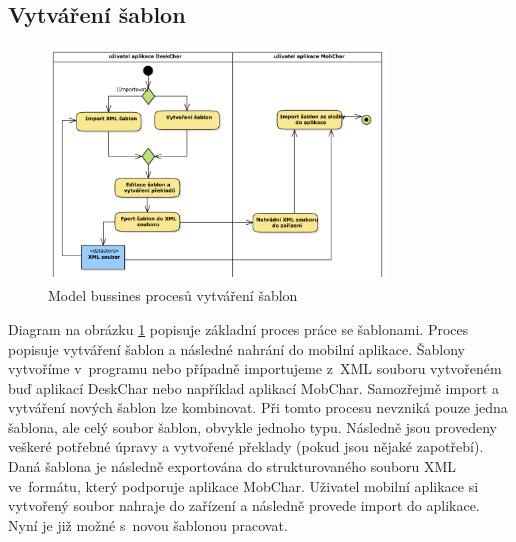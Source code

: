 \documentclass[thesis=B,czech]{resources/FITthesis}[2012/06/26]
\begin{document}
\subsection{Vytváření šablon} \label{sec:vytvareni_sablon}
\begin{figure}\centering
	\includegraphics[width=0.8\textwidth]{images/bussiness_sablony}
	\caption[Business proces vytváření šablon]{Model bussines procesů vytváření šablon}\label{fig:bp_sablony}
\end{figure}
Diagram na obrázku \ref{fig:bp_sablony} popisuje základní proces práce se šablonami. Proces popisuje vytváření šablon a následné nahrání do mobilní aplikace. Šablony vytvoříme v~programu nebo případně importujeme z~XML souboru vytvořeném buď aplikací DeskChar nebo například aplikací MobChar. Samozřejmě import a vytváření nových šablon lze kombinovat. Při tomto procesu nevzniká pouze jedna šablona, ale celý soubor šablon, obvykle jednoho typu. Následně jsou provedeny veškeré potřebné úpravy a vytvořené překlady (pokud jsou nějaké zapotřebí). Daná šablona je následně exportována do strukturovaného souboru XML ve~formátu, který podporuje aplikace MobChar. Uživatel mobilní aplikace si vytvořený soubor nahraje do zařízení a následně provede import do aplikace. Nyní je již možné s~novou šablonou pracovat.
\end{document}
